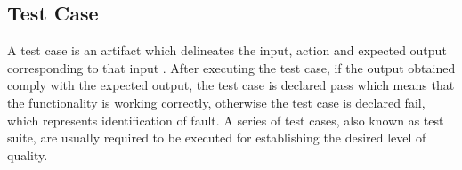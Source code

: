 



\subsection{Test Case}
A test case is an artifact which delineates the input, action and expected output corresponding to that input \cite{ahmed2010software}. After executing the test case, if the output obtained comply with the expected output, the test case is declared pass which means that the functionality is working correctly, otherwise the test case is declared fail, which represents identification of fault. A series of test cases, also known as test suite, are usually required to be executed for establishing the desired level of quality.


